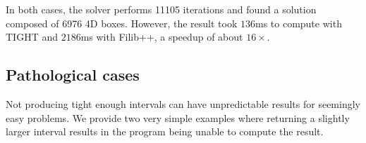 In both cases, the solver performs 11105 iterations and found a solution composed of 6976 4D boxes. However, the result took $136$ms to compute with TIGHT and $2186$ms with Filib++, a speedup of about $16\times$.


\subsection{Pathological cases}
Not producing tight enough intervals can have unpredictable results for seemingly easy problems. We provide two very simple examples where returning a slightly larger interval results in the program being unable to compute the result.

